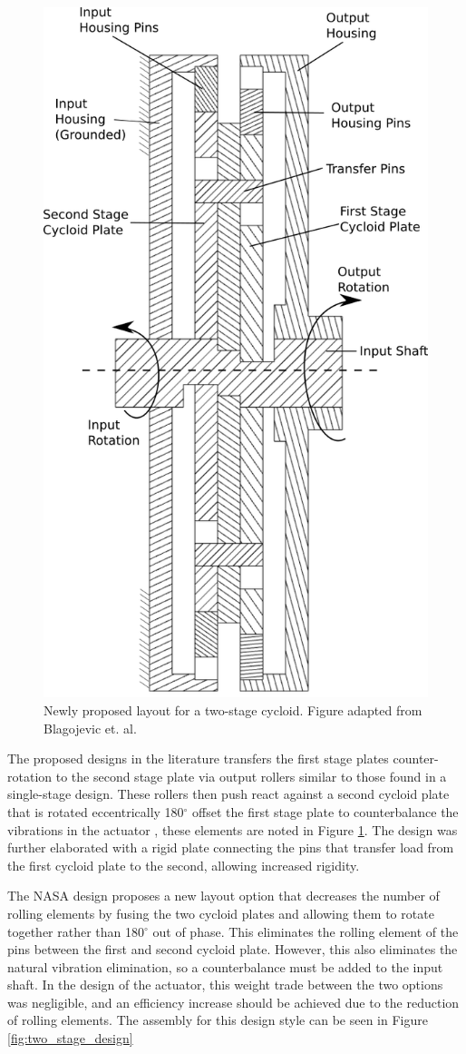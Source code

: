 \begin{figure}[!b]
	\centering
	\includegraphics[width=0.48\linewidth]{fig/new_layout}
   \caption{Newly proposed layout for a two-stage cycloid. Figure adapted from Blagojevic et. al. \cite{ref:new_two_stage}}
   \label{fig:two_stage_simple_cross}
\end{figure}

The proposed designs in the literature transfers the first stage plates counter-rotation to the second stage plate via output rollers similar to those found in a single-stage design. These rollers then push react against a second cycloid plate that is rotated eccentrically 180$^\circ$ offset the first stage plate to counterbalance the vibrations in the actuator \cite{ref:new_two_stage}, these elements are noted in Figure \ref{fig:two_stage_simple_cross}. The design was further elaborated with a rigid plate connecting the pins that transfer load from the first cycloid plate to the second, allowing increased rigidity. 

The NASA design proposes a new layout option that decreases the number of rolling elements by fusing the two cycloid plates and allowing them to rotate together rather than 180$^\circ$ out of phase. This eliminates the rolling element of the pins between the first and second cycloid plate. However, this also eliminates the natural vibration elimination, so a counterbalance must be added to the input shaft. In the design of the actuator, this weight trade between the two options was negligible, and an efficiency increase should be achieved due to the reduction of rolling elements. The assembly for this design style can be seen in Figure \ref{fig:two_stage_design} 

